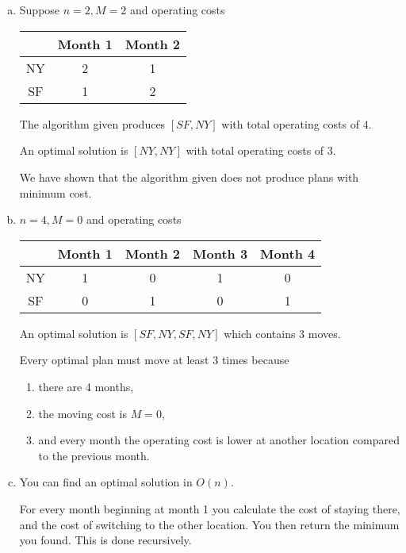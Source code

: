 \documentclass[12pt, a4paper]{article}
\begin{document}
\section{} %
\begin{enumerate}[(a)]
	\item %
	Suppose $n = 2, M = 2$ and operating costs\\
	\begin{tabular}{|c||c|c|}
		\hline
		& Month 1 & Month 2\\
		\hline
		NY & 2 & 1\\
		\hline
		SF & 1 & 2\\
		\hline
	\end{tabular}

	The algorithm given produces $[SF, NY]$ with total operating costs of $4$.

	An optimal solution is $[NY, NY]$ with total operating costs of $3$.

	We have shown that the algorithm given does not produce plans with minimum cost.

	\item %
	$n = 4, M = 0$ and operating costs\\
	\begin{tabular}{|c||c|c|c|c|}
		\hline
		& Month 1 & Month 2 & Month 3 & Month 4\\
		\hline
		NY & 1 & 0 & 1 & 0\\
		\hline
		SF & 0 & 1 & 0 & 1\\
		\hline
	\end{tabular}

	An optimal solution is $[SF, NY, SF, NY]$ which contains 3 moves.

	Every optimal plan must move at least 3 times because
	\begin{enumerate}
		\item there are 4 months,
		\item the moving cost is $M = 0$,
		\item and every month the operating cost is lower at another location compared to the previous month.
	\end{enumerate}

	\item %
	You can find an optimal solution in $O(n)$.

	For every month beginning at month 1 you calculate the cost of staying there, and the cost of switching to the other location. You then return the minimum you found. This is done recursively.


\end{enumerate}
\end{document}
